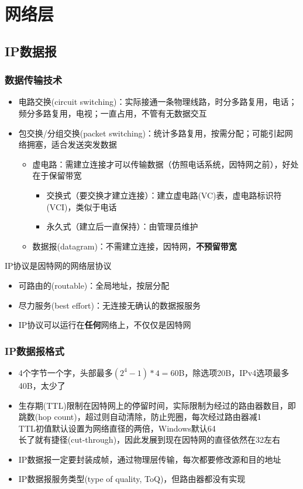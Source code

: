 
\section{网络层}
\subsection{IP数据报}
\subsubsection{数据传输技术}
\begin{itemize}
\item 电路交换(circuit switching)：实际接通一条物理线路，时分多路复用，电话；频分多路复用，电视；一直占用，不管有无数据交互
\item 包交换/分组交换(packet switching)：统计多路复用，按需分配；可能引起网络拥塞，适合发送突发数据
\begin{itemize}
	\item 虚电路：需建立连接才可以传输数据（仿照电话系统，因特网之前），好处在于保留带宽
	\begin{itemize}
	    \item 交换式（要交换才建立连接）：建立虚电路(VC)表，虚电路标识符(VCI)，类似于电话
	    \item 永久式（建立后一直保持）：由管理员维护
	\end{itemize}
	\item 数据报(datagram)：不需建立连接，因特网，\textbf{不预留带宽}
\end{itemize}
\end{itemize}

IP协议是因特网的网络层协议
\begin{itemize}
\item 可路由的(routable)：全局地址，按层分配
\item 尽力服务(best effort)：无连接无确认的数据报服务
\item IP协议可以运行在\textbf{任何}网络上，不仅仅是因特网
\end{itemize}

\subsubsection{IP数据报格式}
\begin{itemize}
\item 4个字节一个字，头部最多$(2^4-1)*4=60$B，除选项20B，IPv4选项最多40B，太少了
\item 生存期(TTL)限制在因特网上的停留时间，实际限制为经过的路由器数目，即跳数(hop count)，超过则自动清除，防止兜圈，每次经过路由器减1\\
TTL初值默认设置为网络直径的两倍，Windows默认64\\
长了就有捷径(cut-through)，因此发展到现在因特网的直径依然在32左右
\item IP数据报一定要封装成帧，通过物理层传输，每次都要修改源和目的地址
\item IP数据报服务类型(type of quality, ToQ)，但路由器都没有实现
\end{itemize}

